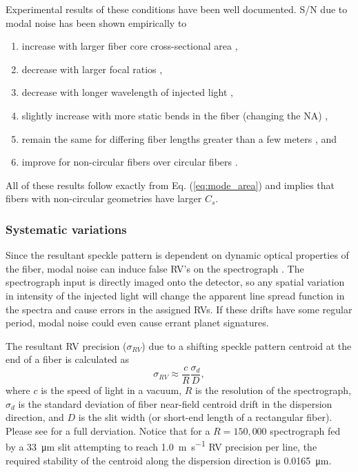 \documentclass[11pt]{article}
\begin{document}
Experimental results of these conditions have been well documented. S/N due to modal noise has been shown empirically to
\begin{enumerate}
\item increase with larger fiber core cross-sectional area \citep{Lemke2010, Sablowski2016},
\item decrease with larger focal ratios \citep{Baudrand2001, Sablowski2016},
\item decrease with longer wavelength of injected light \citep{Baudrand2001},
\item slightly increase with more static bends in the fiber (changing the NA) \citep{Imai1979},
\item remain the same for differing fiber lengths greater than a few meters \citep{Baudrand2001}, and
\item improve for non-circular fibers over circular fibers \citep{Sablowski2016, Sturmer2016}.
\end{enumerate}
All of these results follow exactly from Eq. (\ref{eq:mode_area}) and implies that fibers with non-circular geometries have larger $C_{s}$.

\subsubsection{Systematic variations}
\label{subsec:sys_var}

Since the resultant speckle pattern is dependent on dynamic optical properties of the fiber, modal noise can induce false RV's on the spectrograph \citep{Mahadevan2014}. The spectrograph input is directly imaged onto the detector, so any spatial variation in intensity of the injected light will change the apparent line spread function in the spectra and cause errors in the assigned RVs. If these drifts have some regular period, modal noise could even cause errant planet signatures.

The resultant RV precision ($\sigma_{RV}$) due to a shifting speckle pattern centroid at the end of a fiber is calculated as
\begin{equation}
\sigma_{RV} \approx \frac{c}{R} \frac{\sigma_d}{D},
\label{eq:rv_error}
\end{equation}
where $c$ is the speed of light in a vacuum, $R$ is the resolution of the spectrograph, $\sigma_d$ is the standard deviation of fiber near-field centroid drift in the dispersion direction, and $D$ is the slit width (or short-end length of a rectangular fiber). Please see \citet{Petersburg2018} for a full derviation. Notice that for a $R=150,000$ spectrograph fed by a \SI{33}{\micro\meter} slit attempting to reach \SI{1.0}{\meter\per\second} RV precision per line, the required stability of the centroid along the dispersion direction is \SI{0.0165}{\micro\meter}.
\end{document}
